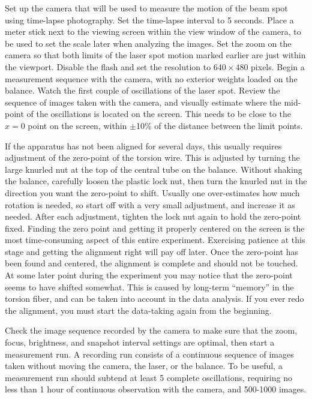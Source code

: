 \documentclass{revtex4}
\begin{document}
Set up the camera that will be used to measure the motion of the beam spot
using time-lapse photography.  Set the time-lapse interval to 5 seconds.
Place a meter stick next to the viewing screen within the view window of
the camera, to be used to set the scale later when analyzing the images.
Set the zoom on the camera so that both limits of the laser spot motion
marked earlier are just within the viewport.  Disable the flash and set
the resolution to $640\times 480$ pixels.  Begin a measurement sequence
with the camera, with no exterior weights loaded on the balance.  Watch
the first couple of oscillations of the laser spot.  Review the sequence
of images taken with the camera, and visually estimate where the mid-point
of the oscillations is located on the screen.  This needs to be close to the
$x=0$ point on the screen, within $\pm$10\% of the distance between the
limit points.

If the apparatus has not been aligned for several days, this
usually requires adjustment of the zero-point of the torsion wire.  This is
adjusted by turning the large knurled nut at the top of the central tube on
the balance.  Without shaking the balance, carefully loosen the plastic lock
nut, then turn the knurled nut in the direction you want the zero-point to
shift.  Usually one over-estimates how much rotation is needed, so start off
with a very small adjustment, and increase it as needed.  After each 
adjustment, tighten the lock nut again to hold the zero-point fixed.  Finding
the zero point and getting it properly centered on the screen is the most
time-consuming aspect of this entire experiment.  Exercising patience at
this stage and getting the alignment right will pay off later.  Once the
zero-point has been found and centered, the alignment is complete and should
not be touched.  At some later point during the experiment you may notice that
the zero-point seems to have shifted somewhat.  This is caused by long-term
``memory'' in the torsion fiber, and can be taken into account in the data
analysis.  If you ever redo the alignment, you must start the data-taking
again from the beginning.

Check the image sequence recorded by the camera to make sure that the zoom,
focus, brightness, and snapshot interval settings are optimal, then start
a measurement run.  A recording run consists of a continuous sequence of 
images taken without moving the camera, the laser, or the balance.  To be
useful, a measurement run should subtend at least 5 complete oscillations,
requiring no less than 1 hour of continuous observation with the camera,
and 500-1000 images.
\end{document}
